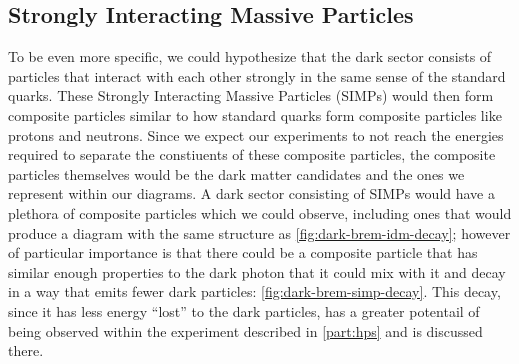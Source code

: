 %

\subsection{Strongly Interacting Massive Particles}
\label{sec:theory-simps}

To be even more specific, we could hypothesize that the dark sector consists of particles that
interact with each other strongly in the same sense of the standard quarks. These Strongly
Interacting Massive Particles (SIMPs) \cite{simp-mechanism-2014,simp-pheno-2018} would then form composite particles similar to how standard
quarks form composite particles like protons and neutrons. Since we expect our experiments to
not reach the energies required to separate the constiuents of these composite particles,
the composite particles themselves would be the dark matter candidates and the ones we represent
within our diagrams. A dark sector consisting of SIMPs would have a plethora of composite particles
which we could observe, including ones that would produce a diagram with the same structure as
\cref{fig:dark-brem-idm-decay}; however of particular importance is that there could be a composite
particle that has similar enough properties to the dark photon that it could mix with it and
decay in a way that emits fewer dark particles: \cref{fig:dark-brem-simp-decay}. This decay, since
it has less energy ``lost'' to the dark particles, has a greater potentail of being observed within
the experiment described in \cref{part:hps} and is discussed there.

